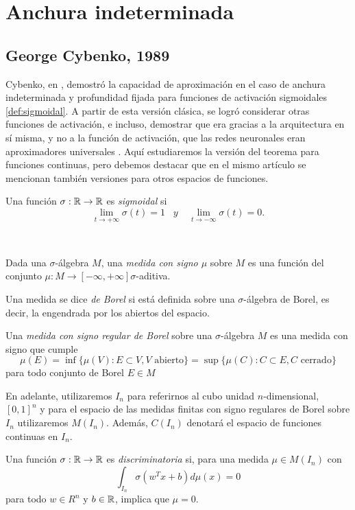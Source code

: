 \section{Anchura indeterminada}
\subsection{George Cybenko, 1989}
Cybenko, en \cite{cybenko1989approximation}, demostró la capacidad de aproximación en el caso de anchura indeterminada y profundidad fijada para funciones de activación sigmoidales \autoref{def:sigmoidal}. A partir de esta versión clásica, se logró considerar otras funciones de activación, e incluso, demostrar que era gracias a la arquitectura en sí misma, y no a la función de activación, que las redes neuronales eran aproximadores universales \cite{Kurt1991251}. Aquí estudiaremos la versión del teorema para funciones continuas, pero debemos destacar que en el mismo artículo se mencionan también versiones para otros espacios de funciones.
\begin{definicion}\label{def:sigmoidal}
Una función $\sigma : \mathbb{R} \to \mathbb{R}$ es \emph{sigmoidal} si $$\lim_{t\to +\infty} \sigma(t)=1 \;\;\; y \;\;\;\; \lim_{t\to -\infty} \sigma(t)=0.$$
\end{definicion}\\

\begin{definicion}
Dada una $\sigma$-álgebra $M$, una \emph{medida con signo $\mu$} sobre $M$ es una función del conjunto $\mu: M\to [-\infty,+\infty] \sigma$-aditiva.
\end{definicion}
\begin{definicion}
Una medida se dice \emph{de Borel} si está definida sobre una $\sigma$-álgebra de Borel, es decir, la engendrada por los abiertos del espacio.
\end{definicion}
\begin{definicion}
Una \emph{medida con signo regular de Borel} sobre una $\sigma$-álgebra $M$ es una medida con signo que cumple $$\mu(E)=\inf\{\mu(V): E\subset V, V \text{ abierto}\}=\sup\{\mu(C): C\subset E, C\text{ cerrado}\}$$
para todo conjunto de Borel $E\in M$
\end{definicion}
En adelante, utilizaremos $I_n$ para referirnos al cubo unidad $n$-dimensional, $[0,1]^n$ y para el espacio de las medidas finitas con signo regulares de Borel sobre $I_n$ utilizaremos $M(I_n)$. Además, $C(I_n)$ denotará el espacio de funciones continuas en $I_n$.

\begin{definicion}\label{def:discriminatoria}
Una función $\sigma : \mathbb{R} \to \mathbb{R}$ es \emph{discriminatoria} si, para una medida $\mu \in M(I_n)$ con $$\int_{I_n} \sigma(w^Tx+b) d\mu(x)=0$$ para todo $ w\in R^n$ y $b\in\mathbb{R}$, implica que $\mu=0$.
\end{definicion}

